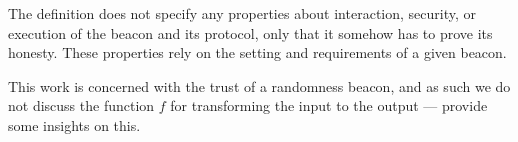 
The definition does not specify any properties about interaction, security, or execution of the beacon and its protocol, only that it somehow has to prove its honesty.
These properties rely on the setting and requirements of a given beacon.

This work is concerned with the trust of a randomness beacon, and as such we do not discuss the function $f$ for transforming the input to the output --- \citet{bonneau2015bitcoin, dodis2004randomness} provide some insights on this.

